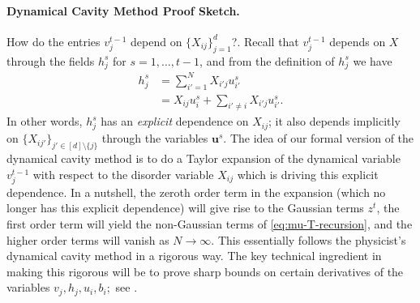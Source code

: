 \documentclass{article}
\newcommand{\1}{\mathbbm{1}}
\theoremstyle{plain}
\theoremstyle{definition}
\theoremstyle{remark}
\newcommand{\bfu}{\boldsymbol{u}}
\begin{document}
\paragraph{Dynamical Cavity Method Proof Sketch.} How do the entries $v_j^{t-1}$ depend on $\{X_{ij}\}_{j=1}^d$?. Recall that $v_j^{t-1}$ depends on $X$ through the fields $h^s_j$ for $s=1,\dots,t-1$, and from the definition of $h_j^s$ we have
\begin{equation}\label{eq:hup}
\begin{split}
    h_j^s &= \sum_{i'=1}^N X_{i'j} u^s_{i'} \\
    &= X_{ij} u^s_{i} + \sum_{i'\neq i} X_{i'j} u^s_{i'}.
\end{split}
\end{equation}
In other words, $h_j^s$ has an \emph{explicit} dependence on $X_{ij}$; it also depends implicitly on $\{X_{ij'}\}_{j'\in [d]\setminus\{j\}}$ through the variables $\bfu^s.$ The idea of our formal version of the dynamical cavity method is to do a Taylor expansion of the dynamical variable $v_j^{t-1}$ with respect to the disorder variable $X_{ij}$ which is driving this explicit dependence. In a nutshell, the zeroth order term in the expansion (which no longer has this explicit dependence) will give rise to the Gaussian terms $z^t$, the first order term will yield the non-Gaussian terms of \eqref{eq:mu-T-recursion}, and the higher order terms will vanish as $N\to\infty.$ This essentially follows the physicist's dynamical cavity method in a rigorous way. The key technical ingredient in making this rigorous will be to prove sharp bounds on certain derivatives of the variables $v_j,h_j,u_i,b_i;$ see .
\end{document}
